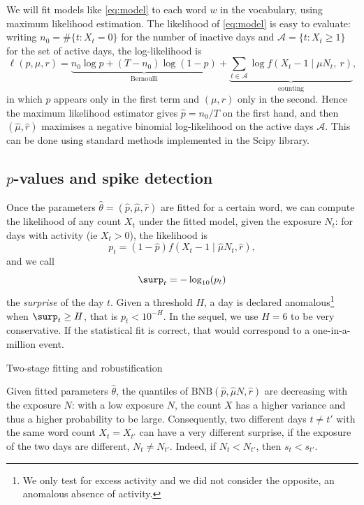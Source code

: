 \documentclass[11pt,a4paper]{article}
\begin{document}
We will fit models like \eqref{eq:model} to each word $w$ in the vocabulary, using maximum likelihood estimation. The likelihood of \eqref{eq:model} is easy to evaluate: writing $n_0 = \#\{t : X_t = 0\}$ for the number of inactive days and
$\mathcal{A} = \{t : X_t \geq 1\}$ for the set of active days, the log-likelihood is
\begin{equation}
  \ell(p, \mu, r)
  = \underbrace{n_0 \log p + (T - n_0) \log (1 - p)}_{\text{Bernoulli}}
  + \underbrace{\sum_{t \in \mathcal{A}}
      \log f\!\left(X_t - 1 \mid  \mu N_t,\ r\right)}_{\text{counting}},
  \label{eq:loglik}
\end{equation}
in which $p$ appears only in the first term and $(\mu, r)$ only in
the second. Hence the maximum likelihood estimator gives $\hat p = n_0/T$
on the first hand, and then $(\hat\mu, \hat r)$ maximises a negative binomial log-likelihood on the active days $\mathcal{A}$. This can be done using standard methods implemented in the Scipy library. 

\subsection{\texorpdfstring{$p$}{p}-values and spike detection}
\label{sec:pvalues}

Once the parameters $\hat{\theta} = (\hat p, \hat \mu, \hat r)$ are fitted for a certain word, we can compute the likelihood of any count $X_t$ under the fitted model, given the exposure $N_t$: for days with activity (ie $X_t > 0$), the likelihood is
\begin{equation}
  p_t =  (1 - \hat p) f(X_t - 1 \mid \hat \mu N_t, \hat r),
  \label{eq:pvalue}
\end{equation}
and we call
\[
  \surp_t = -\log_{10} (p_t)
\]
the \emph{surprise} of the day $t$. Given a threshold $H$, a day is declared anomalous\footnote{We only test for excess activity and we did not consider the opposite, an anomalous absence of activity. } when
$\surp_t \geq H$, that is $p_t < 10^{-H}$. In the sequel, we use $H=6$ to be very conservative. If the statistical fit is correct, that would correspond to a one-in-a-million event. 



\begin{remark}Two-stage fitting and robustification\end{remark}

\begin{remark}
Given fitted parameters $\hat{\theta}$, the quantiles of $\mathrm{BNB}(\hat p, \hat\mu N, \hat r)$ are decreasing with the exposure $N$: with a low exposure $N$, the count $X$ has a higher variance and thus a higher probability to be large. Consequently, two different days $t\neq t'$ with the same word count $X_t = X_{t'}$ can have a very different surprise, if the exposure of the two days are different, $N_t \neq N_{t'}$. Indeed, if $N_t < N_{t'}$, then $s_t < s_{t'}$.
\end{remark}
\end{document}
